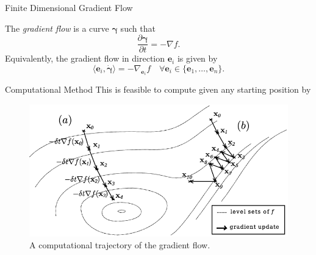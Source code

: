\documentclass[usenames,dvipsnames]{beamer}
\theoremstyle{definition}
\theoremstyle{theorem}
\begin{document}
        
    
        
 
        
        \begin{frame}{Finite Dimensional Gradient Flow}
        
        \begin{definition}
        The \emph{gradient flow} is a curve $\boldsymbol{\gamma}$ such that
        \[
        \frac{\partial \boldsymbol\gamma}{\partial t} = -\nabla f.
        \]
        Equivalently, the gradient flow in direction $\mathbf{e}_i$ is given by
            \[
            \langle \mathbf{e}_i ,\boldsymbol{\dot{\gamma}}\rangle = -\nabla_{\mathbf{e}_i} f \quad \forall \mathbf{e}_i \in \{\mathbf{e}_1,\dots,\mathbf{e}_n\}.
            \]
        \end{definition}
        \end{frame}
        
        \begin{frame}{Computational Method}
            This is feasible to compute given any starting position by
            \begin{figure}[H]
                \centering
                \includegraphics[width=.6\textwidth]{images/gradient-trajectory.png}
                \caption{A computational trajectory of the gradient flow.}
                \label{fig:gradient_trajectory}
            \end{figure}
        \end{frame}
        
\end{document}
